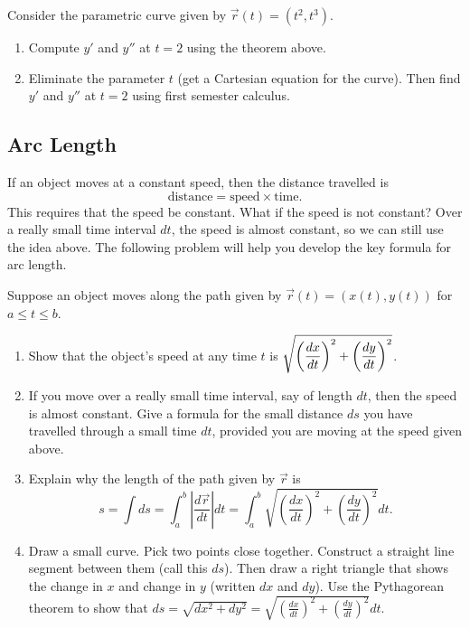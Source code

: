 \begin{problem} 
Consider the parametric curve given by $\vec r(t) = (t^2,t^3)$. 
\begin{enumerate}
\item Compute $y'$ and $y''$ at $t=2$ using the theorem above.
\item Eliminate the parameter $t$ (get a Cartesian equation for the curve). Then find $y'$ and $y''$ at $t=2$ using first semester calculus.
\end{enumerate}
\end{problem}

\subsection{Arc Length} 
If an object moves at a constant speed, then the distance travelled is 
$$\text{distance} = \text{speed}\times\text{time}.$$
This requires that the speed be constant.  What if the speed is not constant? Over a really small time interval $dt$, the speed is almost constant, so we can still use the idea above. The following problem will help you develop the key formula for arc length.

\begin{problem} 
Suppose an object moves along the path given by $\vec r(t)=(x(t),y(t))$ for $a\leq t\leq b$. 
\begin{enumerate}
\item Show that the object's speed at any time $t$ is 
$\displaystyle\sqrt{\left(\frac{dx}{dt}\right)^2+\left(\frac{dy}{dt}\right)^2}$.
\item If you move over a really small time interval, say of length $dt$, then the speed is almost constant.  Give a formula for the small distance $ds$ you have travelled through a small time $dt$, provided you are moving at the speed given above. 
\item  Explain why the length of the path given by $\vec r$ is 
$$s=\int ds=\int_a^b \left|\frac{d\vec r}{dt}\right| dt=\int_a^b \sqrt{\left(\frac{dx}{dt}\right)^2+\left(\frac{dy}{dt}\right)^2}dt.$$
\item {} Draw a small curve.  Pick two points close together.  Construct a straight line segment between them (call this $ds$).  Then draw a right triangle that shows the change in $x$ and change in $y$ (written $dx$ and $dy$).  Use the Pythagorean theorem to show that $ds=\sqrt{dx^2+dy^2}=\sqrt{\left(\frac{dx}{dt}\right)^2+\left(\frac{dy}{dt}\right)^2}dt$.  
\end{enumerate}
\end{problem}

